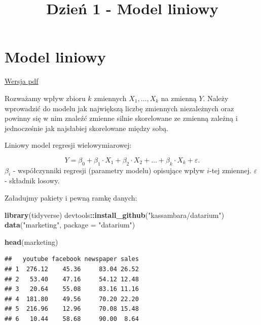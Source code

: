 \documentclass[]{article}
\title{Dzień 1 - Model liniowy}
\author{}
\date{}
\newenvironment{Shaded}{\begin{snugshade}}{\end{snugshade}}
\newcommand{\KeywordTok}[1]{\textcolor[rgb]{0.13,0.29,0.53}{\textbf{#1}}}
\newcommand{\DataTypeTok}[1]{\textcolor[rgb]{0.13,0.29,0.53}{#1}}
\newcommand{\StringTok}[1]{\textcolor[rgb]{0.31,0.60,0.02}{#1}}
\newcommand{\OperatorTok}[1]{\textcolor[rgb]{0.81,0.36,0.00}{\textbf{#1}}}
\newcommand{\NormalTok}[1]{#1}
\begin{document}
\maketitle

{
\setcounter{tocdepth}{5}
\tableofcontents
}
\section{Model liniowy}\label{model-liniowy}

\href{modelliniowy.pdf}{Wersja pdf}

Rozważamy wpływ zbioru \(k\) zmiennych \(X_1, \ldots, X_k\) na zmienną
\(Y\). Należy wprowadzić do modelu jak największą liczbę zmiennych
niezależnych oraz powinny się w nim znaleźć zmienne silnie skorelowane
ze zmienną zależną i jednocześnie jak najsłabiej skorelowane między
sobą.

Liniowy model regresji wielowymiarowej:

\[Y=\beta_0 +\beta_1\cdot X_1+\beta_2\cdot X_2+\ldots+\beta_k\cdot X_k+\varepsilon.\]
\(\beta_i\) - współczynniki regresji (parametry modelu) opisujące wpływ
\(i\)-tej zmiennej. \(\varepsilon\) - składnik losowy.

Załadujmy pakiety i pewną ramkę danych:

\begin{Shaded}
\begin{Highlighting}[]
\KeywordTok{library}\NormalTok{(tidyverse)}
\NormalTok{devtools}\OperatorTok{::}\KeywordTok{install_github}\NormalTok{(}\StringTok{"kassambara/datarium"}\NormalTok{)}
\KeywordTok{data}\NormalTok{(}\StringTok{"marketing"}\NormalTok{, }\DataTypeTok{package =} \StringTok{"datarium"}\NormalTok{)}
\end{Highlighting}
\end{Shaded}

\begin{Shaded}
\begin{Highlighting}[]
\KeywordTok{head}\NormalTok{(marketing)}
\end{Highlighting}
\end{Shaded}

\begin{verbatim}
##   youtube facebook newspaper sales
## 1  276.12    45.36     83.04 26.52
## 2   53.40    47.16     54.12 12.48
## 3   20.64    55.08     83.16 11.16
## 4  181.80    49.56     70.20 22.20
## 5  216.96    12.96     70.08 15.48
## 6   10.44    58.68     90.00  8.64
\end{verbatim}
\end{document}
